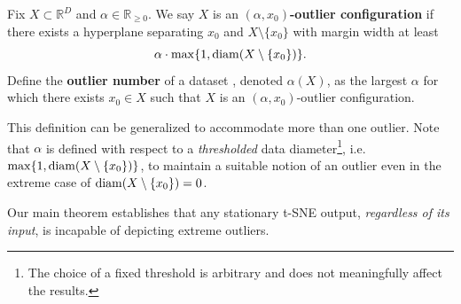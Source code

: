 \begin{definition}\label{def:alpha_outlier}%
Fix \(X \subset \mathbb{R}^D\) %
and \(\alpha \in \mathbb{R}_{\geq 0}\). We say \(X\) is an \textbf{\((\alpha, x_0)\)-outlier configuration} if there exists a hyperplane separating \(x_0\) and \(X\setminus \{x_0\}\) 
with margin width at least
   \begin{equation*}\label{eq:alpha_margin}
       \alpha \cdot \max\{1, \operatorname*{diam}(X\setminus\{x_0\}) \}.
   \end{equation*}
 Define the \textbf{outlier number} of a dataset%
 , denoted \(\alpha(X)\), as the largest \(\alpha\) for which there exists \(x_0 \in X\) such that \(X\) is an \((\alpha, x_0)\)-outlier configuration.
\end{definition}



This definition can be generalized to accommodate more than one outlier. Note that \(\alpha\) is defined with respect to a \textit{thresholded} data diameter\footnote{The choice of a fixed threshold is arbitrary and does not meaningfully affect the results.}, i.e.\ \(\max\{1,\operatorname*{diam}(X\setminus\{x_0\})\}\), to maintain a suitable notion of an outlier even in the extreme case of \(\operatorname*{diam}(X\setminus\{x_0\}) = 0\). 




Our main theorem establishes that any stationary t-SNE output, \textit{regardless of its input}, is incapable of depicting extreme outliers. %





